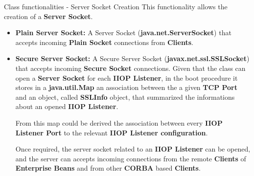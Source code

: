 \documentclass{../common/latex_classes/pdf_presentation}
\begin{document}
		\begin{frame}{Class functionalities - Server Socket Creation}
			This functionality allows the creation of a \textbf{Server Socket}.
			\begin{itemize}
				\item \textbf{Plain Server Socket:}
				A Server Socket (\textbf{java.net.ServerSocket}) that accepts incoming \textbf{Plain Socket} connections from \textbf{Clients}.
				\item \textbf{Secure Server Socket:}
				A Secure Server Socket (\textbf{javax.net.ssl.SSLSocket}) that accepts incoming \textbf{Secure Socket} connections.
				Given that the class can open a \textbf{Server Socket} for each \textbf{IIOP Listener}, in the boot procedure it stores in a \textbf{java.util.Map} an association between the a given \textbf{TCP Port} and an object, called \textbf{SSLInfo} object, that summarized the informations about an opened \textbf{IIOP Listener}.
				
				From this map could be derived the association between every \textbf{IIOP Listener Port} to the relevant \textbf{IIOP Listener configuration}.
				
				Once required, the server socket related to an \textbf{IIOP Listener} can be opened, and the server can accepts incoming connections from the remote \textbf{Clients} of \textbf{Enterprise Beans} and from other \textbf{CORBA}
				based \textbf{Clients}.
			\end{itemize}
		\end{frame}
		
\end{document}
